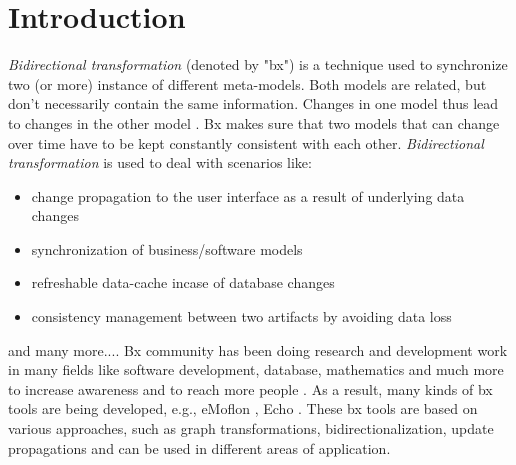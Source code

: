 \section{Introduction}\label{sec:introduction}
 \textit{Bidirectional transformation} (denoted by "bx") is a technique used to synchronize two (or more) instance of different meta-models. Both models are related, but don't necessarily contain the same information. Changes in one model thus lead to changes in the other model \cite{bx-grace}. Bx makes sure that two models that can change over time have to be kept constantly consistent with each other.
\newline\newline\textit{Bidirectional transformation} is used to deal with scenarios like:
\begin{itemize}
	\item {change propagation to the user interface as a result of underlying data changes}	
	\item {synchronization of business/software models}
	\item {refreshable data-cache incase of database changes}
	\item {consistency management between two artifacts by avoiding data loss}
\end{itemize}
    and many more....
\newline\newline Bx community has been doing research and development work in many fields like software development, database, mathematics and much more to increase awareness and to reach more people \cite{bx-dagstuhl}\cite{bx-grace}. As a result, many kinds of bx tools are being developed, e.g., eMoflon \cite{emoflon-part4}, Echo \cite{echo}. These bx tools are based on various approaches, such as graph transformations, bidirectionalization, update propagations \cite{bx-community} and can be used in different areas of application.

